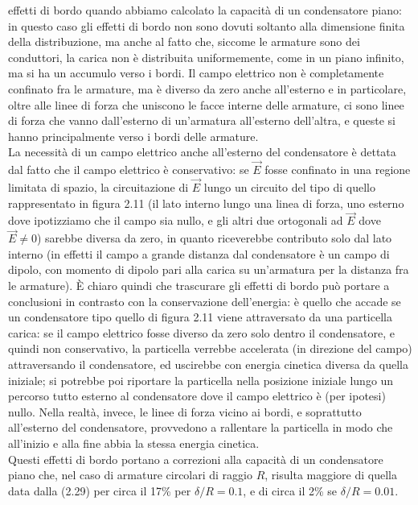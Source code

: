effetti di bordo quando abbiamo calcolato la capacit\`a di un condensatore
piano: in questo caso gli effetti di bordo non sono dovuti soltanto alla
dimensione finita della distribuzione, ma anche al fatto che, siccome le
armature sono dei conduttori, la carica non \`e distribuita uniformemente, come
in un piano infinito, ma si ha un accumulo verso i bordi. Il campo elettrico non
\`e completamente confinato fra le armature, ma \`e diverso da zero anche
all'esterno e in particolare, oltre alle linee di forza che uniscono le facce
interne delle armature, ci sono linee di forza che vanno dall'esterno di
un'armatura all'esterno dell'altra, e queste si hanno principalmente verso i
bordi delle armature.\\
La necessit\`a di un campo elettrico anche all'esterno del condensatore \`e
dettata dal fatto che il campo elettrico \`e conservativo: se $\vec E$ fosse
confinato in una regione limitata di spazio, la circuitazione di $\vec E$ lungo
un circuito del tipo di quello rappresentato in figura 2.11 (il lato interno
lungo una linea di forza, uno esterno dove ipotizziamo che il campo sia nullo, e
gli altri due ortogonali ad $\vec E$ dove $\vec E\neq0$) sarebbe diversa da
zero, in quanto riceverebbe contributo solo dal lato interno (in effetti il
campo a grande distanza dal condensatore \`e un campo di dipolo, con momento di
dipolo pari alla carica su un'armatura per la distanza fra le armature).
\`E chiaro quindi che trascurare gli effetti di bordo pu\`o portare a
conclusioni in contrasto con la conservazione dell'energia: \`e quello che
accade se un condensatore tipo quello di figura 2.11 viene attraversato da una
particella carica: se il campo elettrico fosse diverso da zero solo dentro il
condensatore, e quindi non conservativo, la particella verrebbe accelerata (in
direzione del campo) attraversando il condensatore, ed uscirebbe con energia
cinetica diversa da quella iniziale; si potrebbe poi riportare la particella
nella posizione iniziale lungo un percorso tutto esterno al condensatore dove il
campo elettrico \`e (per ipotesi) nullo. Nella realt\`a, invece, le linee di
forza vicino ai bordi, e soprattutto all'esterno del condensatore, provvedono a
rallentare la particella in modo che all'inizio e alla fine abbia la stessa
energia cinetica.\\
Questi effetti di bordo portano a correzioni alla capacit\`a di un condensatore
piano che, nel caso di armature circolari di raggio $R$, risulta maggiore di
quella data dalla (2.29) per circa il 17\% per $\delta/R=0.1$, e di circa il 2\%
se $\delta/R=0.01$.
